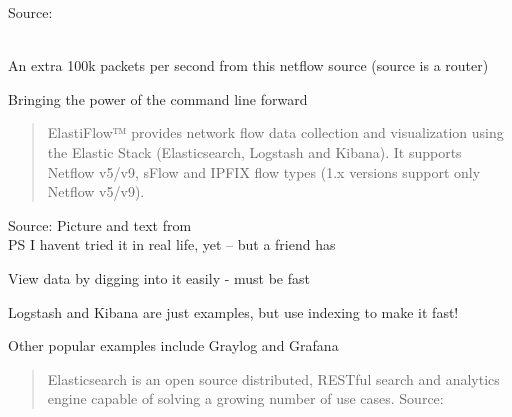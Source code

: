 \documentclass[Screen16to9,17pt]{foils}
\begin{document}
Source: \\{\footnotesize
{}\\
}






\centerline{An extra 100k packets per second from this netflow source (source is a router)}




\centerline{Bringing the power of the command line forward}




\begin{quote}
  ElastiFlow™ provides network flow data collection and visualization using the Elastic Stack (Elasticsearch, Logstash and Kibana). It supports Netflow v5/v9, sFlow and IPFIX flow types (1.x versions support only Netflow v5/v9).
\end{quote}
Source: Picture and text from  \\
PS I havent tried it in real life, yet -- but a friend has



\begin{list1}
\item View data by digging into it easily - must be fast
\item Logstash and Kibana are just examples, but use indexing to make it fast!
\item Other popular examples include Graylog and Grafana
\end{list1}



\begin{quote}
Elasticsearch is an open source distributed, RESTful search and analytics engine capable of solving a growing number of use cases. Source: 
\end{quote}
\end{document}
